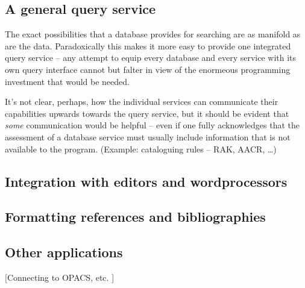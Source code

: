 \subsection{A general query service}
\label{sec:genquery}

The exact possibilities that a database provides for searching are as
manifold as are the data. Paradoxically this makes it more easy to
provide one integrated query service -- any attempt to equip every
database and every service with its own query interface cannot but
falter in view of the enormeous programming investment that would be
needed.

It's not clear, perhaps, how the individual services can communicate
their capabilities upwards towards the query service, but it should be
evident that \textit{some} communication would be helpful -- even if
one fully acknowledges that the assessment of a database service must
usually include information that is not available to the
program. (Example: cataloguing rules -- RAK, AACR, \dots)





\subsection{Integration with editors and wordprocessors}
\label{sec:wpintegr}


\subsection{Formatting references  and bibliographies}
\label{sec:formatting}


\subsection{Other applications}
\label{sec:applications}

[Connecting to OPACS, etc. ]

